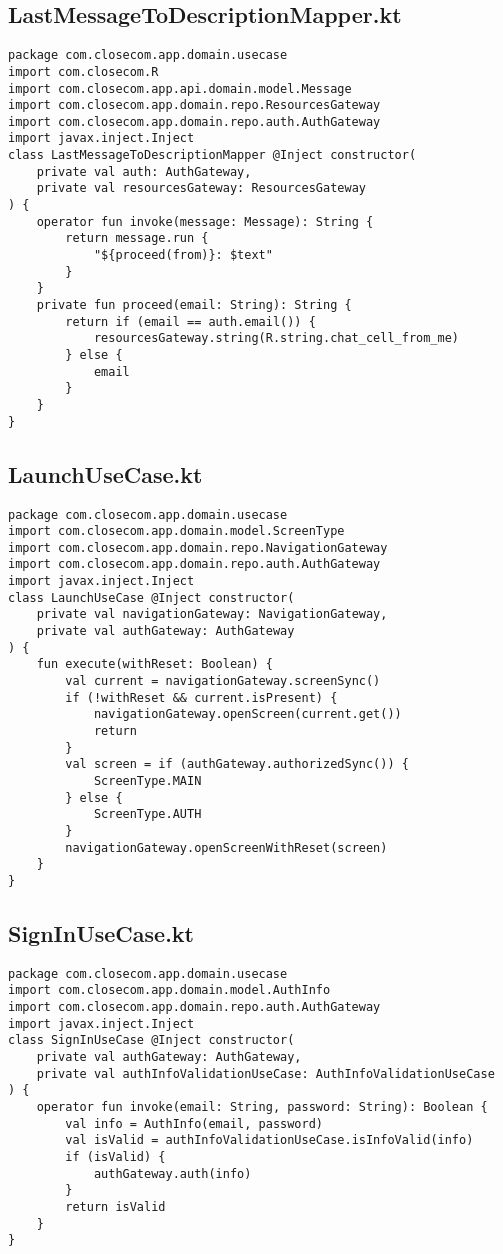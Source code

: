 \documentclass[listing]{espd}
\begin{document}
\subsection{LastMessageToDescriptionMapper.kt}
\begin{verbatim}
package com.closecom.app.domain.usecase
import com.closecom.R
import com.closecom.app.api.domain.model.Message
import com.closecom.app.domain.repo.ResourcesGateway
import com.closecom.app.domain.repo.auth.AuthGateway
import javax.inject.Inject
class LastMessageToDescriptionMapper @Inject constructor(
    private val auth: AuthGateway,
    private val resourcesGateway: ResourcesGateway
) {
    operator fun invoke(message: Message): String {
        return message.run {
            "${proceed(from)}: $text"
        }
    }
    private fun proceed(email: String): String {
        return if (email == auth.email()) {
            resourcesGateway.string(R.string.chat_cell_from_me)
        } else {
            email
        }
    }
}
\end{verbatim}

\subsection{LaunchUseCase.kt}
\begin{verbatim}
package com.closecom.app.domain.usecase
import com.closecom.app.domain.model.ScreenType
import com.closecom.app.domain.repo.NavigationGateway
import com.closecom.app.domain.repo.auth.AuthGateway
import javax.inject.Inject
class LaunchUseCase @Inject constructor(
    private val navigationGateway: NavigationGateway,
    private val authGateway: AuthGateway
) {
    fun execute(withReset: Boolean) {
        val current = navigationGateway.screenSync()
        if (!withReset && current.isPresent) {
            navigationGateway.openScreen(current.get())
            return
        }
        val screen = if (authGateway.authorizedSync()) {
            ScreenType.MAIN
        } else {
            ScreenType.AUTH
        }
        navigationGateway.openScreenWithReset(screen)
    }
}
\end{verbatim}

\subsection{SignInUseCase.kt}
\begin{verbatim}
package com.closecom.app.domain.usecase
import com.closecom.app.domain.model.AuthInfo
import com.closecom.app.domain.repo.auth.AuthGateway
import javax.inject.Inject
class SignInUseCase @Inject constructor(
    private val authGateway: AuthGateway,
    private val authInfoValidationUseCase: AuthInfoValidationUseCase
) {
    operator fun invoke(email: String, password: String): Boolean {
        val info = AuthInfo(email, password)
        val isValid = authInfoValidationUseCase.isInfoValid(info)
        if (isValid) {
            authGateway.auth(info)
        }
        return isValid
    }
}
\end{verbatim}
\end{document}
